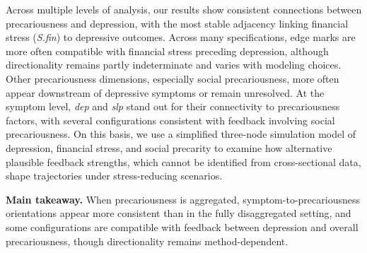 \documentclass[
]{article}
\begin{document}
\textcolor{BrickRed}{Across multiple levels of analysis, our results show consistent connections between precariousness and depression, with the most stable adjacency linking financial stress (\textit{S.fin}) to depressive outcomes. Across many specifications, edge marks are more often compatible with financial stress preceding depression, although directionality remains partly indeterminate and varies with modeling choices. Other precariousness dimensions, especially social precariousness, more often appear downstream of depressive symptoms or remain unresolved. At the symptom level, \textit{dep} and \textit{slp} stand out for their connectivity to precariousness factors, with several configurations consistent with feedback involving social precariousness. On this basis, we use a simplified three-node simulation model of depression, financial stress, and social precarity to examine how alternative plausible feedback strengths, which cannot be identified from cross-sectional data, shape trajectories under stress-reducing scenarios.}

\textcolor{BrickRed}{\textbf{Main takeaway.} When precariousness is aggregated, symptom-to-precariousness orientations appear more consistent than in the fully disaggregated setting, and some configurations are compatible with feedback between depression and overall precariousness, though directionality remains method-dependent.}

\end{document}
